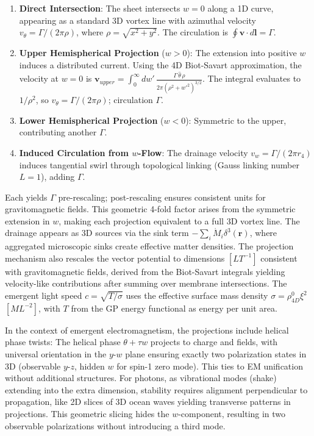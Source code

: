 \begin{enumerate}
\item \textbf{Direct Intersection}: The sheet intersects $w=0$ along a 1D curve, appearing as a standard 3D vortex line with azimuthal velocity $v_\theta = \Gamma / (2\pi \rho)$, where $\rho = \sqrt{x^2 + y^2}$. The circulation is $\oint \mathbf{v} \cdot d\mathbf{l} = \Gamma$.
\item \textbf{Upper Hemispherical Projection} ($w > 0$): The extension into positive $w$ induces a distributed current. Using the 4D Biot-Savart approximation, the velocity at $w=0$ is $\mathbf{v}_{upper} = \int_0^\infty dw' \, \frac{\Gamma \, \hat{\theta} \, \rho}{2\pi (\rho^2 + w'^2)^{3/2}}$. The integral evaluates to $1 / \rho^2$, so $v_\theta = \Gamma / (2\pi \rho)$; circulation $\Gamma$.
\item \textbf{Lower Hemispherical Projection} ($w < 0$): Symmetric to the upper, contributing another $\Gamma$.
\item \textbf{Induced Circulation from $w$-Flow}: The drainage velocity $v_w = \Gamma / (2\pi r_4)$ induces tangential swirl through topological linking (Gauss linking number $L=1$), adding $\Gamma$.
\end{enumerate}

Each yields $\Gamma$ pre-rescaling; post-rescaling ensures consistent units for gravitomagnetic fields. This geometric 4-fold factor arises from the symmetric extension in $w$, making each projection equivalent to a full 3D vortex line. The drainage appears as 3D sources via the sink term $-\sum_i \dot{M}_i \delta^3(\mathbf{r})$, where aggregated microscopic sinks create effective matter densities. The projection mechanism also rescales the vector potential to dimensions $[L T^{-1}]$ consistent with gravitomagnetic fields, derived from the Biot-Savart integrals yielding velocity-like contributions after summing over membrane intersections. The emergent light speed $c = \sqrt{T / \sigma}$ uses the effective surface mass density $\sigma = \rho_{4D}^0 \xi^2$ $[M L^{-2}]$, with $T$ from the GP energy functional as energy per unit area.

In the context of emergent electromagnetism, the projections include helical phase twists: The helical phase $\theta + \tau w$ projects to charge and fields, with universal orientation in the $y$-$w$ plane ensuring exactly two polarization states in 3D (observable $y$-$z$, hidden $w$ for spin-1 zero mode). This ties to EM unification without additional structures. For photons, as vibrational modes (shake) extending into the extra dimension, stability requires alignment perpendicular to propagation, like 2D slices of 3D ocean waves yielding transverse patterns in projections. This geometric slicing hides the $w$-component, resulting in two observable polarizations without introducing a third mode.

